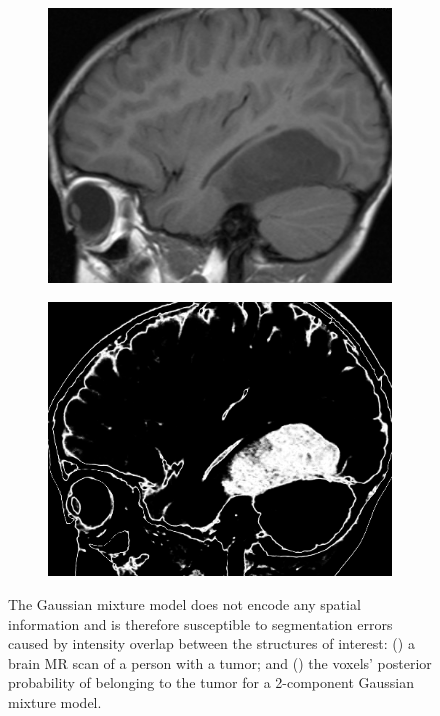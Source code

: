 \documentclass[10pt,twoside]{book}
\begin{document}
\begin{figure}
  \centering
  \begin{subfigure}{0.48\textwidth}
    \centering
    \includegraphics[width=\textwidth]{brainTumor}
    \caption{}
    \label{fig:tumor_noMRF_data}
  \end{subfigure}
  \begin{subfigure}{0.48\textwidth}
    \centering
    \includegraphics[width=\textwidth]{brainTumorSegmentation_noMRF}
    \caption{}
    \label{fig:tumor_noMRF_seg}
  \end{subfigure}  
  \caption{The Gaussian mixture model does not encode any spatial information and is therefore susceptible to segmentation errors caused by intensity overlap between the structures of interest: () a brain MR scan of a person with a tumor; and () the voxels' posterior probability of belonging to the tumor for a 2-component Gaussian mixture model.}
  \label{fig:tumor_noMRF}
\end{figure}
\end{document}
